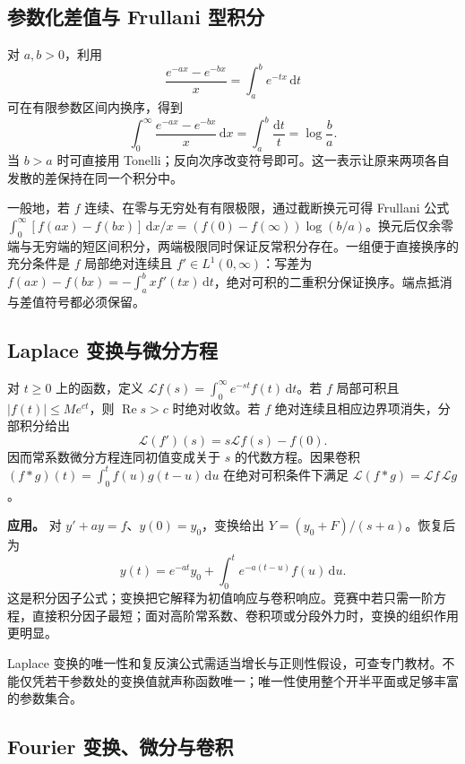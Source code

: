 \documentclass[12pt,fontset=fandol]{ctexart}
\begin{document}
\subsection{参数化差值与 Frullani 型积分}

\label{app:transform-frullani}

对 $a,b>0$，利用
\[
\frac{e^{-ax}-e^{-bx}}x=\int_a^be^{-tx}\,\mathrm dt
\]
可在有限参数区间内换序，得到
\[
\int_0^\infty\frac{e^{-ax}-e^{-bx}}x\,\mathrm dx
=\int_a^b\frac{\mathrm dt}{t}=\log\frac ba.
\]
当 $b>a$ 时可直接用 Tonelli；反向次序改变符号即可。这一表示让原来两项各自发散的差保持在同一个积分中。

一般地，若 $f$ 连续、在零与无穷处有有限极限，通过截断换元可得 Frullani 公式 $\int_0^\infty[f(ax)-f(bx)]\,\mathrm dx/x=(f(0)-f(\infty))\log(b/a)$。换元后仅余零端与无穷端的短区间积分，两端极限同时保证反常积分存在。一组便于直接换序的充分条件是 $f$ 局部绝对连续且 $f'\in L^1(0,\infty)$：写差为 $f(ax)-f(bx)=-\int_a^bxf'(tx)\,\mathrm dt$，绝对可积的二重积分保证换序。端点抵消与差值符号都必须保留。

\subsection{Laplace 变换与微分方程}

\label{app:transform-laplace}

对 $t\geq0$ 上的函数，定义 $\mathcal Lf(s)=\int_0^\infty e^{-st}f(t)\,\mathrm dt$。若 $f$ 局部可积且 $|f(t)|\leq Me^{ct}$，则 $\operatorname{Re}s>c$ 时绝对收敛。若 $f$ 绝对连续且相应边界项消失，分部积分给出
\[
\mathcal L(f')(s)=s\mathcal Lf(s)-f(0).
\]
因而常系数微分方程连同初值变成关于 $s$ 的代数方程。因果卷积 $(f*g)(t)=\int_0^tf(u)g(t-u)\,\mathrm du$ 在绝对可积条件下满足 $\mathcal L(f*g)=\mathcal Lf\,\mathcal Lg$。

\textbf{应用。} 对 $y'+ay=f$、$y(0)=y_0$，变换给出 $Y=(y_0+F)/(s+a)$。恢复后为
\[
y(t)=e^{-at}y_0+\int_0^te^{-a(t-u)}f(u)\,\mathrm du.
\]
这是积分因子公式；变换把它解释为初值响应与卷积响应。竞赛中若只需一阶方程，直接积分因子最短；面对高阶常系数、卷积项或分段外力时，变换的组织作用更明显。

Laplace 变换的唯一性和复反演公式需适当增长与正则性假设，可查专门教材。不能仅凭若干参数处的变换值就声称函数唯一；唯一性使用整个开半平面或足够丰富的参数集合。

\subsection{Fourier 变换、微分与卷积}
\end{document}
